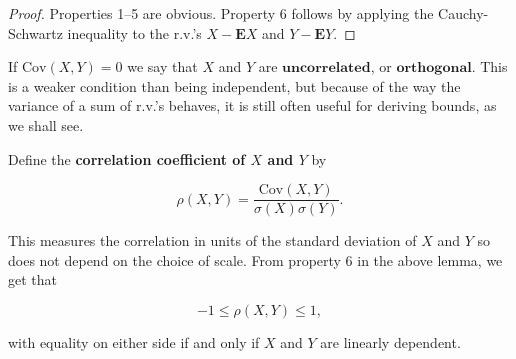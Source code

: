 \begin{proof}
Properties 1--5 are obvious. Property 6 follows by
applying the Cauchy-Schwartz inequality to the r.v.'s
$X-\mathbf{E} X$ and $Y-\mathbf{E} Y$.
\end{proof}

\noindent If $\textrm{Cov}(X,Y)=0$ we say that $X$ and $Y$ are
$\textbf{uncorrelated}$, or $\textbf{orthogonal}$.
This is a weaker condition than being independent, but
because of the way the variance of a sum of r.v.'s
behaves, it is still often useful for deriving bounds,
as we shall see.

Define the \textbf{correlation coefficient of $X$ and $Y$}
by

\[
\rho(X,Y) = \frac{\textrm{Cov}(X,Y)}{\sigma(X)\sigma(Y)}.
\]

\noindent This measures the correlation in units of the
standard deviation of $X$ and $Y$ so does not depend
on the choice of scale. From property 6 in the above
lemma, we get that

\[
-1\le \rho(X,Y)\le 1,
\]

\noindent with equality on either side if and only if $X$ and
$Y$ are linearly dependent.
